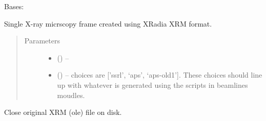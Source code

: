 \documentclass[letterpaper,10pt,english]{sphinxmanual}
\begin{document}
\begin{fulllineitems}
\label{\detokenize{xanespy:xanespy.xradia.XRMFile}}
Bases: 

Single X-ray micrscopy frame created using XRadia XRM format.
\begin{quote}\begin{description}
\item[{Parameters}] \leavevmode\begin{itemize}
\item {} 
 (\sphinxstyleliteralemphasis{-}) -- 

\item {} 
 (\sphinxstyleliteralemphasis{-}) -- choices are {[}'ssrl', `aps', `aps-old1'{]}. These choices should
line up with whatever is generated using the scripts in
beamlines moudles.

\end{itemize}

\end{description}\end{quote}

\begin{fulllineitems}
\label{\detokenize{xanespy:xanespy.xradia.XRMFile.aps_old1_regex}}
\end{fulllineitems}


\begin{fulllineitems}
\label{\detokenize{xanespy:xanespy.xradia.XRMFile.binning}}
\end{fulllineitems}


\begin{fulllineitems}
\label{\detokenize{xanespy:xanespy.xradia.XRMFile.close}}
Close original XRM (ole) file on disk.

\end{fulllineitems}


\end{fulllineitems}
\end{document}
